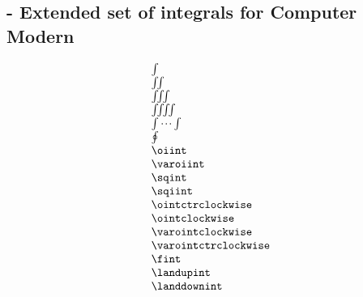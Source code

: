 
\subsection{ - Extended set of integrals for Computer Modern}

\begin{demo}{}{}
  \begin{equation*}
    \begin{array}{l}
      \int                 \\
      \iint                \\
      \iiint               \\
      \iiiint              \\
      \idotsint            \\
      \oint                \\
      \oiint               \\
      \varoiint            \\
      \sqint               \\
      \sqiint              \\
      \ointctrclockwise    \\
      \ointclockwise       \\
      \varointclockwise    \\
      \varointctrclockwise \\
      \fint                \\
      \landupint           \\
      \landdownint         \\
    \end{array}
  \end{equation*}
\end{demo}
